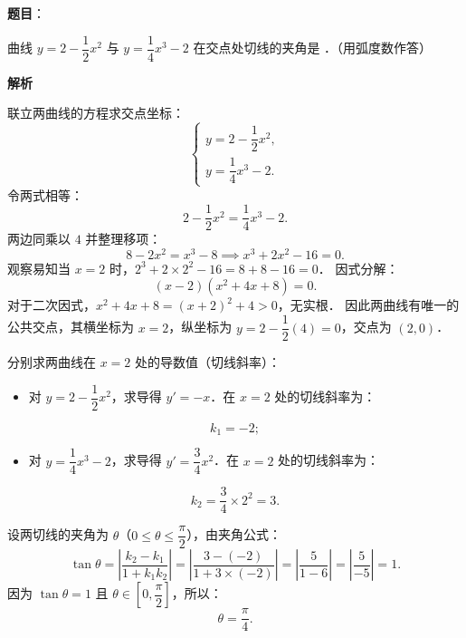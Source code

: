 \begin{answer}

\textbf{题目}：

曲线 $y = 2 - \dfrac{1}{2}x^2$ 与 $y = \dfrac{1}{4}x^3 - 2$ 在交点处切线的夹角是 \gkblank{}．（用弧度数作答）

\textbf{解析}

联立两曲线的方程求交点坐标：
\nopagebreak[4]
\[
\begin{cases}
y = 2 - \dfrac{1}{2}x^2, \\
y = \dfrac{1}{4}x^3 - 2.
\end{cases}
\]
令两式相等：
\nopagebreak[4]
\[
2 - \frac{1}{2}x^2 = \frac{1}{4}x^3 - 2.
\]
两边同乘以 $4$ 并整理移项：
\nopagebreak[4]
\[
8 - 2x^2 = x^3 - 8 \implies x^3 + 2x^2 - 16 = 0.
\]
观察易知当 $x = 2$ 时，$2^3 + 2 \times 2^2 - 16 = 8 + 8 - 16 = 0$．
因式分解：
\nopagebreak[4]
\[
(x - 2)(x^2 + 4x + 8) = 0.
\]
对于二次因式，$x^2 + 4x + 8 = (x + 2)^2 + 4 > 0$，无实根．
因此两曲线有唯一的公共交点，其横坐标为 $x = 2$，纵坐标为 $y = 2 - \dfrac{1}{2}(4) = 0$，交点为 $(2, 0)$．

分别求两曲线在 $x = 2$ 处的导数值（切线斜率）：
\begin{itemize}
\item 对 $y = 2 - \dfrac{1}{2}x^2$，求导得 $y' = -x$．在 $x = 2$ 处的切线斜率为：
\end{itemize}
\nopagebreak[4]
\[
k_1 = -2;
\]
\begin{itemize}
\item 对 $y = \dfrac{1}{4}x^3 - 2$，求导得 $y' = \dfrac{3}{4}x^2$．在 $x = 2$ 处的切线斜率为：
\end{itemize}
\nopagebreak[4]
\[
k_2 = \frac{3}{4} \times 2^2 = 3.
\]

设两切线的夹角为 $\theta$（$0 \leqslant \theta \leqslant \dfrac{\pi}{2}$），由夹角公式：
\nopagebreak[4]
\[
\tan\theta = \left|\frac{k_2 - k_1}{1 + k_1 k_2}\right| = \left|\frac{3 - (-2)}{1 + 3 \times (-2)}\right| = \left|\frac{5}{1 - 6}\right| = \left|\frac{5}{-5}\right| = 1.
\]
因为 $\tan\theta = 1$ 且 $\theta \in \left[0, \dfrac{\pi}{2}\right]$，所以：
\nopagebreak[4]
\[
\theta = \frac{\pi}{4}.
\]


\end{answer}
